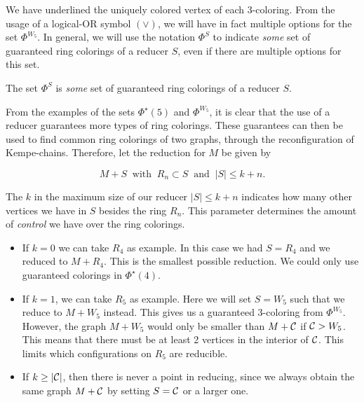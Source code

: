 We have underlined the uniquely colored vertex of each 3-coloring. From the usage of a logical-OR symbol $(\lor)$, we will have in fact multiple options for the set $\Phi^{W_5}$. In general, we will use the notation $\Phi^S$ to indicate \textit{some} set of guaranteed ring colorings of a reducer $S$, even if there are multiple options for this set.

\begin{definition}
    The set $\Phi^S$ is \emph{some} set of guaranteed ring colorings of a reducer $S$.
\end{definition}

From the examples of the sets $\Phi^\star(5)$ and $\Phi^{W_5}$, it is clear that the use of a reducer guarantees more types of ring colorings. These guarantees can then be used to find common ring colorings of two graphs, through the reconfiguration of Kempe-chains. Therefore, let the reduction for $M$ be given by

\begin{equation}
    M+S \;\;  \text{with} \;\; R_n \subset S \;\; \text{and} \;\; |S| \leq k+n.
\end{equation}

The $k$ in the maximum size of our reducer $|S| \leq k+n$ indicates how many other vertices we have in $S$ besides the ring $R_n$. This parameter determines the amount of \textit{control} we have over the ring colorings. 

\begin{itemize}
    \item If $k=0$ we can take $R_4$ as example. In this case we had $S=R_4$ and we reduced to $M+R_4$. This is the smallest possible reduction. We could only use guaranteed colorings in $\Phi^\star(4)$.
    
    \item If $k=1$, we can take $R_5$ as example. Here we will set $S=W_5$ such that we reduce to $M+W_5$ instead. This gives us a guaranteed 3-coloring from $\Phi^{W_5}$. However, the graph $M+W_5$ would only be smaller than $M+\mathcal{C}$ if $\mathcal{C} > W_5$. This means that there must be at least 2 vertices in the interior of $\mathcal{C}$. This limits which configurations on $R_5$ are reducible.
    
    \item If $k \geq |\mathcal{C}|$, then there is never a point in reducing, since we always obtain the same graph $M+\mathcal{C}$ by setting $S=\mathcal{C}$ or a larger one. 
\end{itemize}

